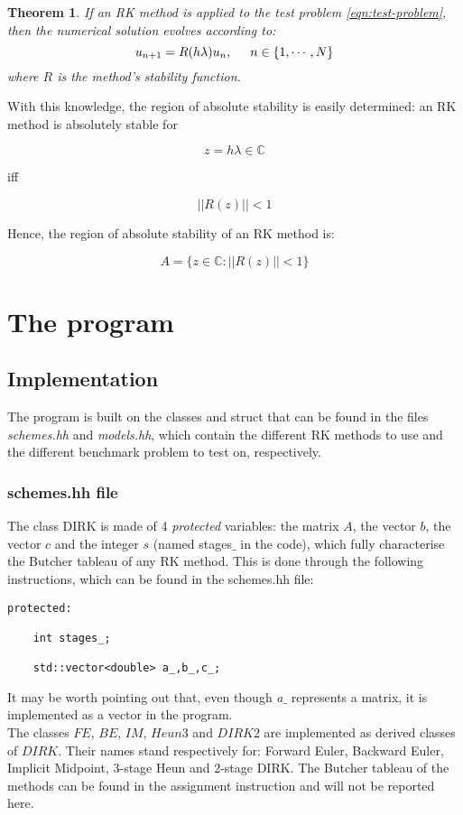 \documentclass[11pt]{article}
\theoremstyle{theorem}
\newtheorem{theorem}{Theorem}
\theoremstyle{definition}
\begin{document}
\begin{theorem}
	\label{thhm:sol-evol-RK}
	If an RK method is applied to the test problem \eqref{eqn:test-problem}, then the numerical solution evolves according to:
	$$u_{n+1}=R(h\lambda)u_n,\hspace{5mm}n\in\lbrace1,\cdots,N\rbrace$$
	where $R$ is the method's stability function.\\
\end{theorem}

With this knowledge, the region of absolute stability is easily determined: an RK
method is absolutely stable for

$$ z=h\lambda\in\mathbb{C} $$

iff

$$||R(z)||<1$$

Hence, the region of absolute stability of an RK method is:

$$A=\lbrace z\in\mathbb{C}:||R(z)||<1\rbrace$$


\section{The program}
\subsection{Implementation}
The program is built on the classes and struct that can be found in the files \emph{schemes.hh} and \emph{models.hh}, which contain the different RK methods to use and the different benchmark problem to test on, respectively.\\
\subsubsection{schemes.hh file}
\label{subsubsec:schemes}
The class DIRK is made of 4 \emph{protected} variables: the matrix $A$, the vector $b$, the vector $c$ and the integer $s$ (named stages$\_$ in the code), which fully characterise the Butcher tableau of any RK method. This is done through the following instructions, which can be found in the schemes.hh file:

\begin{lstlisting}
protected:

	int stages_;

	std::vector<double> a_,b_,c_;
\end{lstlisting}

It may be worth pointing out that, even though \emph{a$\_$} represents a matrix, it is implemented as a vector in the program.\\
The classes $FE$, $BE$, $IM$, $Heun3$ and $DIRK2$ are implemented as derived classes of $DIRK$. Their names stand respectively for: Forward Euler, Backward Euler, Implicit Midpoint, 3-stage Heun and 2-stage DIRK. The Butcher tableau of the methods can be found in the assignment instruction and will not be reported here.\\
\end{document}
